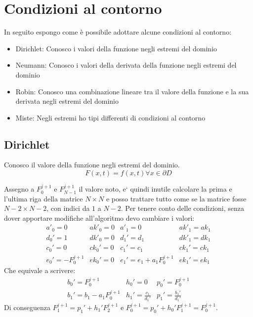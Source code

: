 \section{Condizioni al contorno}
In seguito espongo come \`e possibile adottare alcune condizioni al contorno:
\begin{itemize}
\item Dirichlet: Conosco i valori della funzione negli estremi del dominio
\item Neumann: Conosco i valori della derivata della funzione negli estremi del dominio
\item Robin: Conosco una combinazione lineare tra il valore della funzione e la sua derivata negli estremi del dominio
\item Miste: Negli estremi ho tipi differenti di condizioni al contorno
\end{itemize}
\subsection{Dirichlet}
Conosco il valore della funzione negli estremi del dominio.
\begin{equation}
  F(x,t) = f(x,t) \forall x \in \partial D
\end{equation}

Assegno a $F_0^{j+1}$ e $F_{N-1}^{j+1}$ il valore noto, e` quindi inutile calcolare la prima e l'ultima riga della matrice $N\times N$ e posso trattare tutto come se la matrice fosse $N-2\times N-2$, con indici da $1$ a $N-2$.
Per tenere conto delle condizioni, senza dover apportare modifiche all'algoritmo devo cambiare i valori:
\begin{equation}
  \begin{array}{ll|ll}
    a'_0 = 0 & ak'_0= 0&	a'_1 = 0 & ak'_1= ak_1\\
    d_0' = 1& dk'_0 = 0&	d_1' = d_1& dk'_1 = dk_1\\
    c_0' =  0& ck_0' = 0&	c_1' =  c_1& ck_1' = ck_1\\
    e_0' = -F_0^{j+1} & ek_0' = 0&	e_1' = e_1+a_1 F^{j+1}_0 & ek_1' = ek_1
  \end{array}
\end{equation}
Che equivale  a scrivere:
\begin{equation}
  \begin{array}{lll}
    b_0' = F_0^{j+1}&h_0' = 0&p_0' = F_0^{j+1}\\
    b_1' = b_1 - a_1 F_0^{j+1}  &h_1' = \frac{c_1}{d_1'}&p_1' = \frac{b_1'}{d_1'}
  \end{array}
\end{equation}
Di conseguenza $F_1^{j+1} = p_1' + h_1'F_2^{j+1}$ e $F_0^{j+1} = p_0' + h_0' F_1^{j+1} = F_0^{j+1}$.

